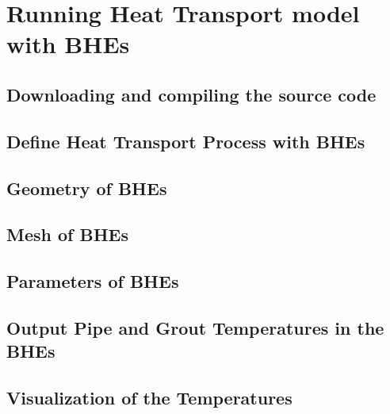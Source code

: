 \chapter{Running Heat Transport model with BHEs}

\section{Downloading and compiling the source code}

\section{Define Heat Transport Process with BHEs}

\section{Geometry of BHEs}

\section{Mesh of BHEs}

\section{Parameters of BHEs}

\section{Output Pipe and Grout Temperatures in the BHEs}

\section{Visualization of the Temperatures}


